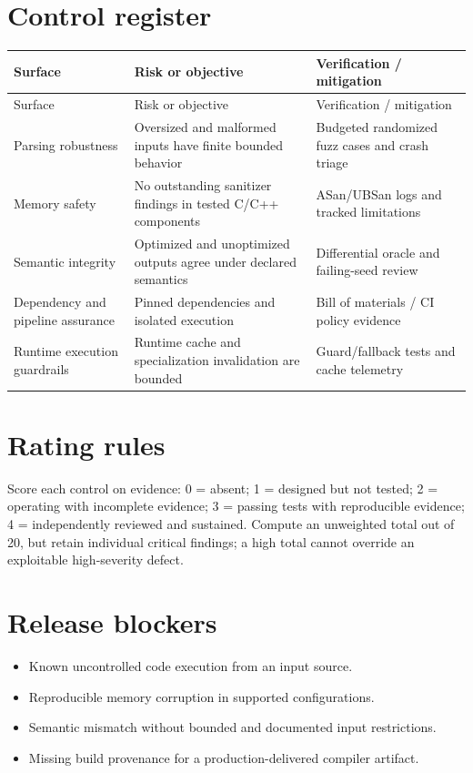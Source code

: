 \documentclass[10pt,letterpaper]{article}
\begin{document}
\section{Control register}
\begin{longtable}{|>{\raggedright\arraybackslash}p{}|>{\raggedright\arraybackslash}p{}|>{\raggedright\arraybackslash}p{}|}
\hline
Surface & Risk or objective & Verification / mitigation\\ \hline\endfirsthead
\hline
Surface & Risk or objective & Verification / mitigation\\ \hline\endhead
Parsing robustness & Oversized and malformed inputs have finite bounded behavior & Budgeted randomized fuzz cases and crash triage\\ \hline
Memory safety & No outstanding sanitizer findings in tested C/C++ components & ASan/UBSan logs and tracked limitations\\ \hline
Semantic integrity & Optimized and unoptimized outputs agree under declared semantics & Differential oracle and failing-seed review\\ \hline
Dependency and pipeline assurance & Pinned dependencies and isolated execution & Bill of materials / CI policy evidence\\ \hline
Runtime execution guardrails & Runtime cache and specialization invalidation are bounded & Guard/fallback tests and cache telemetry\\ \hline
\end{longtable}

\section{Rating rules}
Score each control on evidence: 0 = absent; 1 = designed but not tested; 2 = operating with incomplete evidence; 3 = passing tests with reproducible evidence; 4 = independently reviewed and sustained. Compute an unweighted total out of 20, but retain individual critical findings; a high total cannot override an exploitable high-severity defect.\par
\section{Release blockers}
\begin{itemize}
\item Known uncontrolled code execution from an input source.
\item Reproducible memory corruption in supported configurations.
\item Semantic mismatch without bounded and documented input restrictions.
\item Missing build provenance for a production-delivered compiler artifact.
\end{itemize}
\end{document}
